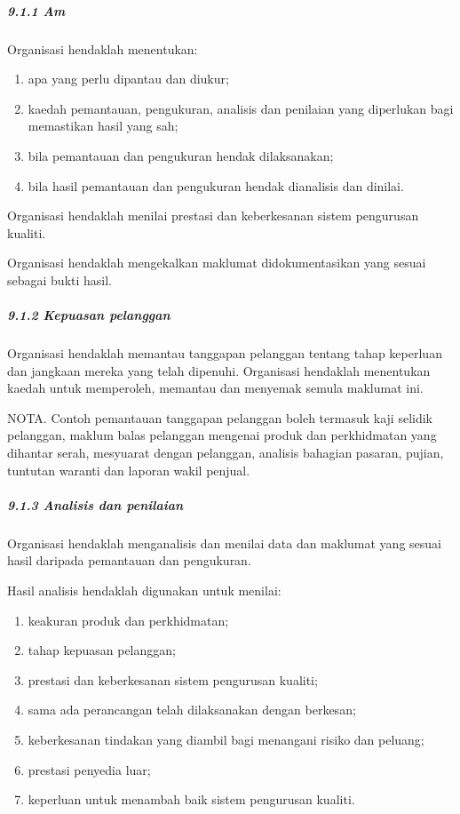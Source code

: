 \documentclass[
]{article}
\begin{document}
\hypertarget{am-7}{%
\subparagraph{9.1.1 Am}\label{am-7}}

Organisasi hendaklah menentukan:

\begin{enumerate}
\def\labelenumi{\alph{enumi})}
\item
  apa yang perlu dipantau dan diukur;
\item
  kaedah pemantauan, pengukuran, analisis dan penilaian yang diperlukan
  bagi memastikan hasil yang sah;
\item
  bila pemantauan dan pengukuran hendak dilaksanakan;
\item
  bila hasil pemantauan dan pengukuran hendak dianalisis dan dinilai.
\end{enumerate}

Organisasi hendaklah menilai prestasi dan keberkesanan sistem pengurusan
kualiti.

Organisasi hendaklah mengekalkan maklumat didokumentasikan yang sesuai
sebagai bukti hasil.

\hypertarget{kepuasan-pelanggan}{%
\subparagraph{9.1.2 Kepuasan pelanggan}\label{kepuasan-pelanggan}}

Organisasi hendaklah memantau tanggapan pelanggan tentang tahap
keperluan dan jangkaan mereka yang telah dipenuhi. Organisasi hendaklah
menentukan kaedah untuk memperoleh, memantau dan menyemak semula
maklumat ini.

NOTA. Contoh pemantauan tanggapan pelanggan boleh termasuk kaji selidik
pelanggan, maklum balas pelanggan mengenai produk dan perkhidmatan yang
dihantar serah, mesyuarat dengan pelanggan, analisis bahagian pasaran,
pujian, tuntutan waranti dan laporan wakil penjual.

\hypertarget{analisis-dan-penilaian}{%
\subparagraph{9.1.3 Analisis dan
penilaian}\label{analisis-dan-penilaian}}

Organisasi hendaklah menganalisis dan menilai data dan maklumat yang
sesuai hasil daripada pemantauan dan pengukuran.

Hasil analisis hendaklah digunakan untuk menilai:

\begin{enumerate}
\def\labelenumi{\alph{enumi})}
\item
  keakuran produk dan perkhidmatan;
\item
  tahap kepuasan pelanggan;
\item
  prestasi dan keberkesanan sistem pengurusan kualiti;
\item
  sama ada perancangan telah dilaksanakan dengan berkesan;
\item
  keberkesanan tindakan yang diambil bagi menangani risiko dan peluang;
\item
  prestasi penyedia luar;
\item
  keperluan untuk menambah baik sistem pengurusan kualiti.
\end{enumerate}
\end{document}
